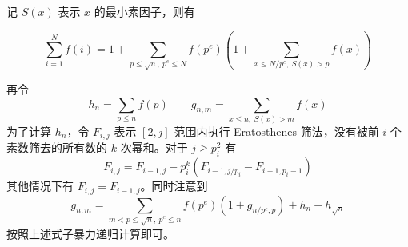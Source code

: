 记 $S(x)$ 表示 $x$ 的最小素因子，则有

$$
\sum_{i=1}^{N}f(i) = 1 + \sum_{p \leq \sqrt{n}, \ p^e \leq N} f(p^e) \left( 
    1 + \sum_{x \leq N/p^e, \ S(x) > p} f(x)
\right)
$$

再令
$$
h_n = \sum_{p \leq n} f(p) \qquad g_{n,m} = \sum_{x \leq n, \ S(x)>m} f(x)
$$
为了计算 $h_n$，令 $F_{i,j}$ 表示 $[2,j]$ 范围内执行 Eratosthenes 筛法，没有被前 $i$ 个素数筛去的所有数的 $k$ 次幂和。对于 $j \geq p_i^2$ 有
$$
F_{i,j}=F_{i-1,j}-p_i^k \left( F_{i-1,j/p_i}-F_{i-1,p_i-1} \right)
$$
其他情况下有 $F_{i,j}=F_{i-1,j}$。同时注意到
$$
g_{n,m}= \sum_{m<p \leq \sqrt{n} , \ p^e \leq n} f(p^e) \left( 1 + g_{n/p^e ,p} \right) + h_n - h_{\sqrt{n}}
$$
按照上述式子暴力递归计算即可。
